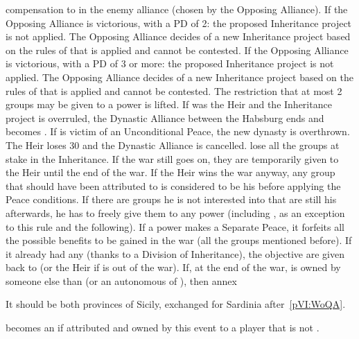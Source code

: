 \begin{digressions}
  compensation to \MAJ in the enemy alliance (chosen by the Opposing
  Alliance).
  \aparag If the Opposing Alliance is victorious, with a PD of 2: the proposed
  Inheritance project is not applied. The Opposing Alliance decides of a new
  Inheritance project based on the rules of  that is applied and cannot be contested.
  \aparag If the Opposing Alliance is victorious, with a PD of 3 or more: the
  proposed Inheritance project is not applied. The Opposing Alliance decides
  of a new Inheritance project based on the rules of
   that is applied and cannot be
  contested. The restriction that at most 2 groups may be given to a power is
  lifted.
  \aparag If \HAB was the Heir and the Inheritance project is overruled, the
  Dynastic Alliance between the Habsburg ends and \AUSmin becomes \AUS.
  \aparag If \SPA is victim of an Unconditional Peace, the new dynasty is
  overthrown.
  \bparag The Heir loses 30 \PV and the Dynastic Alliance is cancelled.
  \bparag \SPA lose all the groups at stake in the Inheritance.
  \bparag If the war still goes on, they are temporarily given to the Heir
  until the end of the war.  If the Heir wins the war anyway, any group that
  should have been attributed to \SPA is considered to be his before applying
  the Peace conditions.  If there are groups he is not interested into that
  are still his afterwards, he has to freely give them to any power (including
  \SPA, as an exception to this rule and the following).
  \aparag If a power makes a Separate Peace, it forfeits all the possible
  benefits to be gained in the war (all the groups mentioned before).
  \bparag If it already had any (thanks to a Division of Inheritance), the
  objective are given back to \SPA (or the Heir if \SPA is out of the war).
  \aparag If, at the end of the war, \provinceNaples is owned by someone else
  than \HIS (or an autonomous \VASSAL of \HIS), then \paysSavoie annex
  \provinceSaldigna
  \begin{todo}
    It should be both provinces of Sicily, exchanged for Sardinia
    after~\ref{pVI:WoQA}.
  \end{todo}

  \effetlong
  \aparag \provinceGibraltar becomes an  if attributed and
  owned by this event to a player that is not \SPA.
\end{digressions}




